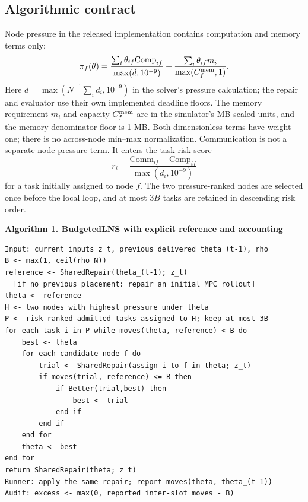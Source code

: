 \documentclass[preprint,12pt]{elsarticle}
\begin{document}
\subsection{Algorithmic contract}\label{algorithmic-contract}

Node pressure in the released implementation contains computation and
memory terms only:
\begin{equation}
 \pi_f(\theta)=
 \frac{\sum_i\theta_{if}\mathrm{Comp}_{if}}
 {\max(\bar d,10^{-9})}
 +\frac{\sum_i\theta_{if}m_i}{\max(C_f^{\rm mem},1)}.
\end{equation}
Here \(\bar d=\max(N^{-1}\sum_i d_i,10^{-9})\) in the solver's pressure
calculation; the repair and evaluator use their own implemented deadline
floors. The memory requirement \(m_i\) and capacity \(C_f^{\rm mem}\)
are in the simulator's MB-scaled units, and the memory denominator floor is 1 MB. Both dimensionless
terms have weight one; there is no
across-node min--max normalization. Communication is not a separate node
pressure term. It enters the task-risk score
\begin{equation}
 r_i=\frac{\mathrm{Comm}_{if}+\mathrm{Comp}_{if}}
 {\max(d_i,10^{-9})}
\end{equation}
for a task initially assigned to node \(f\). The two pressure-ranked
nodes are selected once before the local loop, and at most \(3B\)
tasks are retained in descending risk order.

\textbf{Algorithm 1. BudgetedLNS with explicit reference and accounting}

\begin{verbatim}
Input: current inputs z_t, previous delivered theta_(t-1), rho
B <- max(1, ceil(rho N))
reference <- SharedRepair(theta_(t-1); z_t)
  [if no previous placement: repair an initial MPC rollout]
theta <- reference
H <- two nodes with highest pressure under theta
P <- risk-ranked admitted tasks assigned to H; keep at most 3B
for each task i in P while moves(theta, reference) < B do
    best <- theta
    for each candidate node f do
        trial <- SharedRepair(assign i to f in theta; z_t)
        if moves(trial, reference) <= B then
            if Better(trial,best) then
                best <- trial
            end if
        end if
    end for
    theta <- best
end for
return SharedRepair(theta; z_t)
Runner: apply the same repair; report moves(theta, theta_(t-1))
Audit: excess <- max(0, reported inter-slot moves - B)
\end{verbatim}
\end{document}
